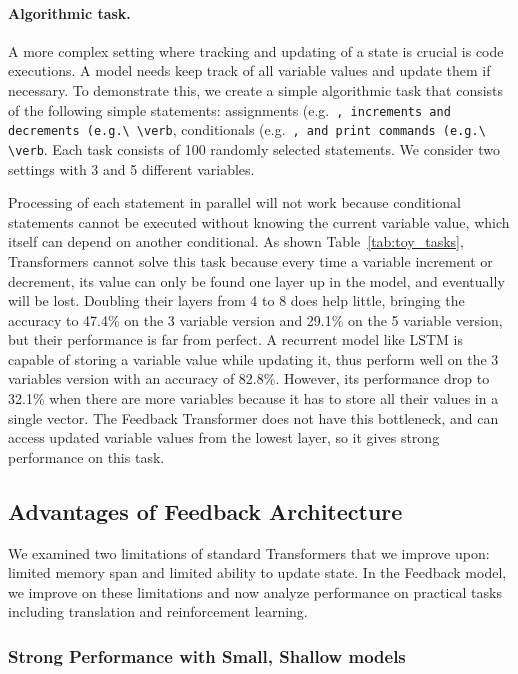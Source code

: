 \documentclass{article} \usepackage{iclr2021_conference}
\newcommand{\tab}[1]{Table~\ref{tab:#1}}
\begin{document}
\paragraph{Algorithmic task.}
A more complex setting where tracking and updating of a state is crucial is code executions. 
A model needs keep track of all variable values and update them if necessary. 
To demonstrate this, we create a simple algorithmic task that consists of the following simple statements: assignments (e.g.\ \verb), increments and decrements (e.g.\ \verb), conditionals (e.g.\ \verb), and print commands (e.g.\ \verb). Each task consists of 100 randomly selected statements. We consider two settings with 3 and 5 different variables.

Processing of each statement in parallel will not work because conditional statements cannot be executed without knowing the current variable value, which itself can depend on another conditional. As shown \tab{toy_tasks}, Transformers cannot solve this task because every time a variable increment or decrement, its value can only be found one layer up in the model, and eventually will be lost. 
Doubling their layers from 4 to 8 does help little, bringing the accuracy to 47.4\% on the 3 variable version and 29.1\% on the 5 variable version, but their performance is far from perfect.
A recurrent model like LSTM is capable of storing a variable value while updating it, thus perform well on the 3 variables version with an accuracy of 82.8\%. However, its performance drop to 32.1\% when there are more variables because it has to store all their values in a single vector. The Feedback Transformer does not have this bottleneck, and can access updated variable values from the lowest layer, so it gives strong performance on this task. 


\subsection{Advantages of Feedback Architecture}

We examined two limitations of standard Transformers that we improve upon: limited memory span and limited ability to update state. In the Feedback model, we improve on these limitations and now analyze performance on practical tasks including translation and reinforcement learning. 


\subsubsection{Strong Performance with Small, Shallow models}
\end{document}
